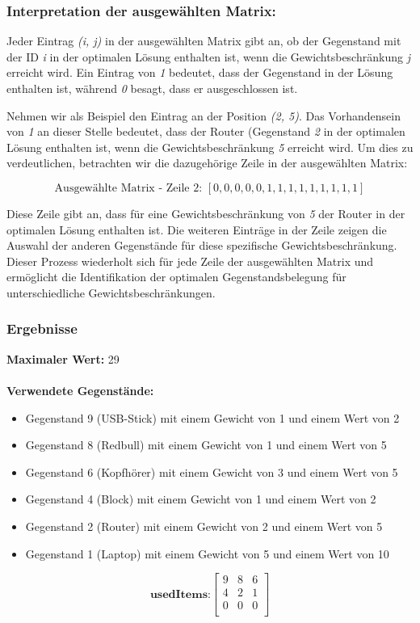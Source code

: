 \subsubsection*{Interpretation der ausgewählten Matrix:}
Jeder Eintrag \textit{(i, j)} in der ausgewählten Matrix gibt an, ob der Gegenstand mit der ID \textit{i} in der optimalen Lösung
enthalten ist, wenn die Gewichtsbeschränkung \textit{j} erreicht wird. Ein Eintrag von \textit{1} bedeutet, dass der Gegenstand
in der Lösung enthalten ist, während \textit{0} besagt, dass er ausgeschlossen ist.

Nehmen wir als Beispiel den Eintrag an der Position \textit{(2, 5)}. Das Vorhandensein von \textit{1} an dieser Stelle bedeutet,
dass der Router (Gegenstand \textit{2} in der optimalen Lösung enthalten ist, wenn die Gewichtsbeschränkung \textit{5} erreicht
wird. Um dies zu verdeutlichen, betrachten wir die dazugehörige Zeile in der ausgewählten Matrix:

\[
    \text{Ausgewählte Matrix - Zeile 2: } [0, 0, 0, 0, 0, 1, 1, 1, 1, 1, 1, 1, 1, 1]
\]

Diese Zeile gibt an, dass für eine Gewichtsbeschränkung von \textit{5} der Router in der optimalen Lösung enthalten ist.
Die weiteren Einträge in der Zeile zeigen die Auswahl der anderen Gegenstände für diese spezifische Gewichtsbeschränkung.
Dieser Prozess wiederholt sich für jede Zeile der ausgewählten Matrix und ermöglicht die Identifikation der optimalen
Gegenstandsbelegung für unterschiedliche Gewichtsbeschränkungen.

\subsubsection*{Ergebnisse}
\textbf{Maximaler Wert:} 29\\
\\
\textbf{Verwendete Gegenstände:}
\begin{itemize}
    \item Gegenstand 9 (USB-Stick) mit einem Gewicht von 1 und einem Wert von 2
    \item Gegenstand 8 (Redbull) mit einem Gewicht von 1 und einem Wert von 5
    \item Gegenstand 6 (Kopfhörer) mit einem Gewicht von 3 und einem Wert von 5
    \item Gegenstand 4 (Block) mit einem Gewicht von 1 und einem Wert von 2
    \item Gegenstand 2 (Router) mit einem Gewicht von 2 und einem Wert von 5
    \item Gegenstand 1 (Laptop) mit einem Gewicht von 5 und einem Wert von 10\\
\end{itemize}
\[
    \textbf{usedItems:}
    \begin{bmatrix}
        9 & 8 & 6 \\
        4 & 2 & 1 \\
        0 & 0 & 0 \\
    \end{bmatrix}
\]

